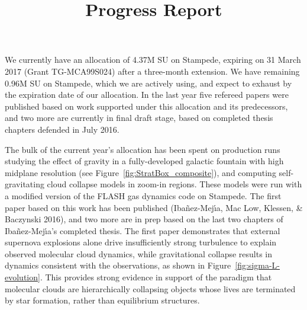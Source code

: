 \documentclass[11pt,preprint]{article}
\title{Progress Report}
\begin{document}
\maketitle
We currently have an allocation of 4.37M SU on Stampede, expiring on 31 March 2017 (Grant TG-MCA99S024) after a three-month extension.  We have remaining 0.96M SU on Stampede, which we are actively using, and expect to exhaust by the expiration date of our allocation.  In the last year five refereed papers were published based on work supported under this allocation and its predecessors, and two more are currently in final draft stage, based on completed thesis chapters defended in July 2016.

The bulk of the current year's allocation has been spent on production runs studying the effect of gravity in a fully-developed galactic fountain with high midplane resolution (see Figure~\ref{fig:StratBox_composite}), and computing self-gravitating cloud collapse models in zoom-in regions. These models were run with a modified version of the FLASH gas dynamics code on Stampede. The first paper based on this work has been published (Iba\~nez-Mej\'{\i}a, Mac Low, Klessen, \& Baczynski 2016), and two more are in prep based on the last two chapters of Iba\~nez-Mej\'{\i}a's completed thesis. The first paper demonstrates that external supernova explosions alone drive insufficiently strong turbulence to explain observed molecular cloud dynamics, while gravitational collapse results in dynamics consistent with the observations, as shown in Figure~\ref{fig:sigma-L-evolution}. This provides strong evidence in support of the paradigm that molecular clouds are hierarchically collapsing objects whose lives are terminated by star formation, rather than equilibrium structures.  
\end{document}
